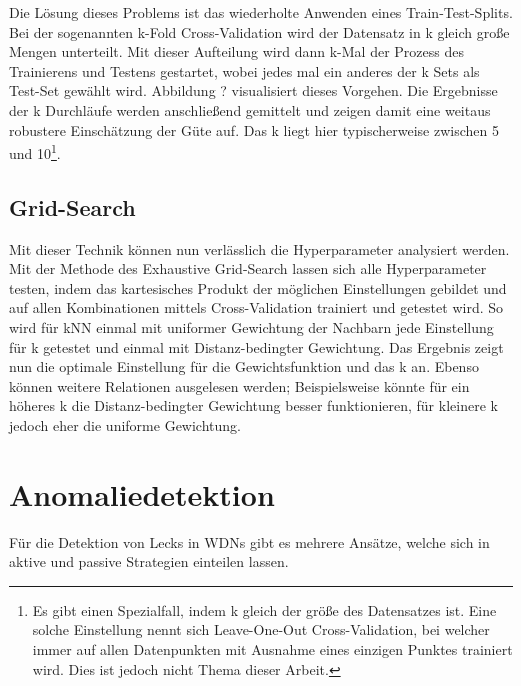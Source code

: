Die Lösung dieses Problems ist das wiederholte Anwenden eines Train-Test-Splits. Bei der sogenannten
 k-Fold Cross-Validation wird der Datensatz in k gleich große Mengen unterteilt. Mit dieser Aufteilung
 wird dann k-Mal der Prozess des Trainierens und Testens gestartet, wobei jedes mal ein anderes der k Sets als
 Test-Set gewählt wird. Abbildung ? visualisiert dieses Vorgehen. Die Ergebnisse der k Durchläufe werden
 anschließend gemittelt und zeigen damit eine weitaus robustere Einschätzung der Güte auf. Das k liegt hier
 typischerweise zwischen 5 und 10\footnote{Es gibt einen Spezialfall, indem k gleich der größe des Datensatzes
 ist. Eine solche Einstellung nennt sich Leave-One-Out Cross-Validation, bei welcher immer auf allen Datenpunkten
 mit Ausnahme eines einzigen Punktes trainiert wird. Dies ist jedoch nicht Thema dieser Arbeit.}.

\subsection*{Grid-Search}

Mit dieser Technik können nun verlässlich die Hyperparameter analysiert werden. Mit der Methode des Exhaustive
 Grid-Search lassen sich alle Hyperparameter testen, indem das kartesisches Produkt der möglichen Einstellungen
 gebildet und auf allen Kombinationen mittels Cross-Validation trainiert und getestet wird. So wird für kNN einmal
 mit uniformer Gewichtung der Nachbarn jede Einstellung für k getestet und einmal mit Distanz-bedingter Gewichtung.
 Das Ergebnis zeigt nun die optimale Einstellung für die Gewichtsfunktion und das k an. Ebenso können weitere
 Relationen ausgelesen werden; Beispielsweise könnte für ein höheres k die Distanz-bedingter Gewichtung besser
 funktionieren, für kleinere k jedoch eher die uniforme Gewichtung.


\section{Anomaliedetektion}

Für die Detektion von Lecks in WDNs gibt es mehrere Ansätze, welche sich in aktive und passive
 Strategien einteilen lassen.

